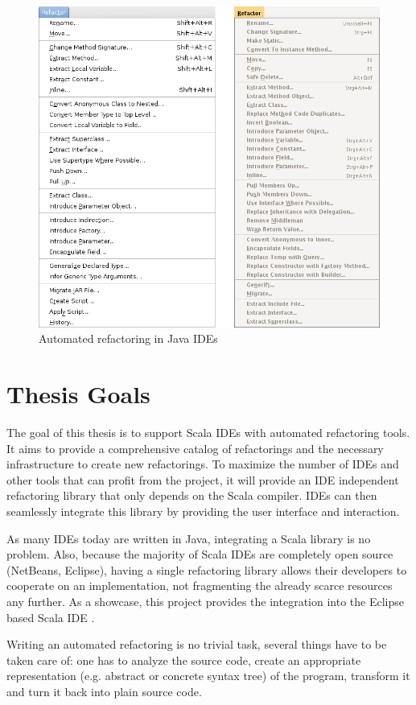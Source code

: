 \documentclass[10pt,a4paper,oneside]{scrreprt}
\begin{document}
\begin{figure}
 \centering
 \includegraphics[width=0.7\linewidth]{ide_refactorings.png}
 \caption{Automated refactoring in Java IDEs}
 \label{figure:ide_refactorings}
\end{figure}

\section{Thesis Goals}

The goal of this thesis is to support Scala IDEs with automated refactoring tools. It aims to provide a comprehensive catalog of refactorings and the necessary infrastructure to create new refactorings. To maximize the number of IDEs and other tools that can profit from the project, it will provide an IDE independent refactoring library that only depends on the Scala compiler. IDEs can then seamlessly integrate this library by providing the user interface and interaction.

As many IDEs today are written in Java, integrating a Scala library is no problem. Also, because the majority of Scala IDEs are completely open source (NetBeans, Eclipse), having a single refactoring library allows their developers to cooperate on an implementation, not fragmenting the already scarce resources any further. As a showcase, this project provides the integration into the Eclipse based Scala IDE \cite{EclipseScalaIDE}.

Writing an automated refactoring is no trivial task, several things have to be taken care of: one has to analyze the source code, create an appropriate representation (e.g. abstract or concrete syntax tree) of the program, transform it and turn it back into plain source code. 
\end{document}
